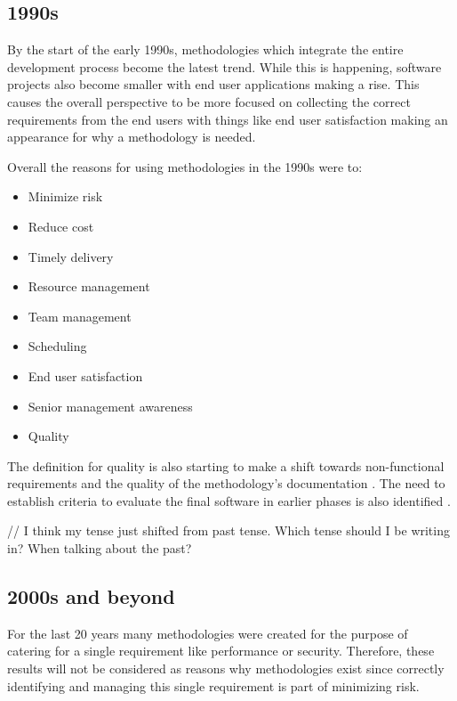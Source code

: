 \subsection{1990s}
By the start of the early 1990s, methodologies which integrate the entire development process become the latest trend.
While this is happening, software projects also become smaller with end user applications making a rise.
This causes the overall perspective to be more focused on collecting the correct requirements \cite{paul_1993} from the end users with things like end user satisfaction making an appearance for why a methodology is needed.
\cite{drake_1991}

Overall the reasons for using methodologies in the 1990s were to:
\begin{itemize}
    \item Minimize risk \cite{drake_1991, trussel_1999}
    \item Reduce cost \cite{drake_1991, scarre_1992, paul_1993}
    \item Timely delivery \cite{drake_1991, scarre_1992, herald_1993, trussel_1999}
    \item Resource management \cite{drake_1991}
    \item Team management \cite{drake_1991}
    \item Scheduling \cite{drake_1991, paul_1993}
    \item End user satisfaction \cite{drake_1991}
    \item Senior management awareness \cite{drake_1991}
    \item Quality \cite{drake_1991, scarre_1992, herald_1993, trussel_1999}
\end{itemize}

The definition for quality is also starting to make a shift towards non-functional requirements and the quality of the methodology's documentation \cite{scarre_1992}.
The need to establish criteria to evaluate the final software in earlier phases is also identified \cite{paul_1993, herald_1993, grossman_1997}.

// I think my tense just shifted from past tense. Which tense should I be writing in? When talking about the past?

\subsection{2000s and beyond}
For the last 20 years many methodologies were created for the purpose of catering for a single requirement like performance or security.
Therefore, these results will not be considered as reasons why methodologies exist since correctly identifying and managing this single requirement is part of minimizing risk.

